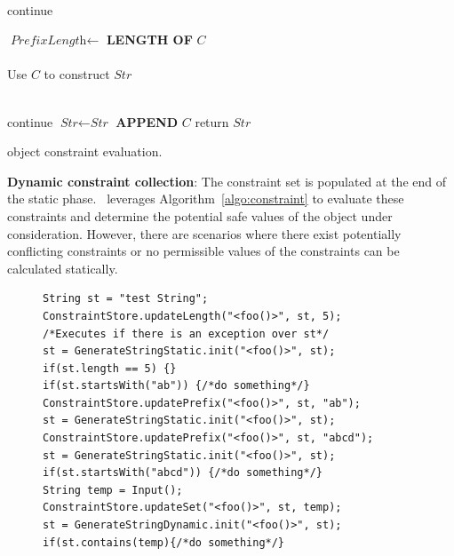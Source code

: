 \begin{mylist}
\begin{algorithm}[t]
{     {
         {\\
          \mytab continue
        }
        
        $\textit{PrefixLength} \longleftarrow$ {\bf LENGTH OF} $C$\\
        
         {\\
          \mytab  Use $C$ to construct $\textit{Str}$
        }
    }

     {
         {\\
          \mytab  continue
        }
        $\textit{Str} \leftarrow \textit{Str}$ {\bf APPEND} $C$
    }
    return $\textit{Str}$
}
\caption{ object constraint evaluation.}
\label{algo:constraint}
\end{algorithm}

 \item \textbf{Dynamic constraint collection}: The constraint set is populated
at the end of the static phase. \tool\ leverages Algorithm~\ref{algo:constraint}
to evaluate these constraints and determine the potential safe values of the
 object under consideration. However, there are scenarios where
there exist potentially conflicting constraints or no permissible values of the
constraints can be calculated statically.


\begin{figure}[!htb]
\begin{lstlisting}
String st = "test String";
ConstraintStore.updateLength("<foo()>", st, 5);
/*Executes if there is an exception over st*/
st = GenerateStringStatic.init("<foo()>", st);
if(st.length == 5) {}
if(st.startsWith("ab")) {/*do something*/}
ConstraintStore.updatePrefix("<foo()>", st, "ab");
st = GenerateStringStatic.init("<foo()>", st);
ConstraintStore.updatePrefix("<foo()>", st, "abcd");
st = GenerateStringStatic.init("<foo()>", st);
if(st.startsWith("abcd")) {/*do something*/}
String temp = Input();
ConstraintStore.updateSet("<foo()>", st, temp);
st = GenerateStringDynamic.init("<foo()>", st);
if(st.contains(temp){/*do something*/}
\end{lstlisting}
\end{figure}


\end{mylist}
